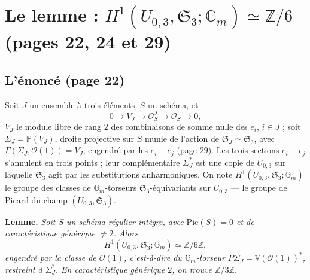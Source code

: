 \documentclass[11pt,a4paper]{article}
\begin{document}
\section*{Le lemme : $H^1(U_{0,3}, \mathfrak{S}_3; \mathbb{G}_m) \simeq \mathbb{Z}/6$ (pages 22, 24 et 29)}

\subsection*{L'énoncé (page 22)}

Soit $J$ un ensemble à trois éléments, $S$ un schéma, et
\[
0 \to V_J \to \mathcal{O}_S^{J} \to \mathcal{O}_S \to 0 ,
\]
$V_J$ le module libre de rang $2$ des combinaisons de somme nulle des $e_i$,
$i \in J$ ; soit $\Sigma_J = \mathbb{P}(V_J)$, droite projective sur $S$ munie de
l'action de $\mathfrak{S}_J \simeq \mathfrak{S}_3$, avec
$\Gamma(\Sigma_J, \mathcal{O}(1)) = V_J$, engendré par les $e_i - e_j$
(page 29). Les trois sections $e_i - e_j$ s'annulent en trois points ; leur
complémentaire $\Sigma_J^{*}$ est une copie de $U_{0,3}$ sur laquelle
$\mathfrak{S}_3$ agit par les substitutions anharmoniques. On note
$H^1(U_{0,3}, \mathfrak{S}_3; \mathbb{G}_m)$ le groupe des classes de
$\mathbb{G}_m$-torseurs $\mathfrak{S}_3$-équivariants sur $U_{0,3}$ — le groupe de
Picard du champ $(U_{0,3}, \mathfrak{S}_3)$.

\textbf{Lemme.} \emph{Soit $S$ un schéma régulier intègre, avec
$\mathrm{Pic}(S) = 0$ et de caractéristique générique $\neq 2$. Alors
\[
H^1(U_{0,3}, \mathfrak{S}_3; \mathbb{G}_m) \simeq \mathbb{Z}/6\mathbb{Z},
\]
engendré par la classe de $\mathcal{O}(1)$, c'est-à-dire du
$\mathbb{G}_m$-torseur $P\Sigma_J = \mathbb{V}(\mathcal{O}(1))^{*}$, restreint à
$\Sigma_J^{*}$. En caractéristique générique $2$, on trouve
$\mathbb{Z}/3\mathbb{Z}$.}
\end{document}
